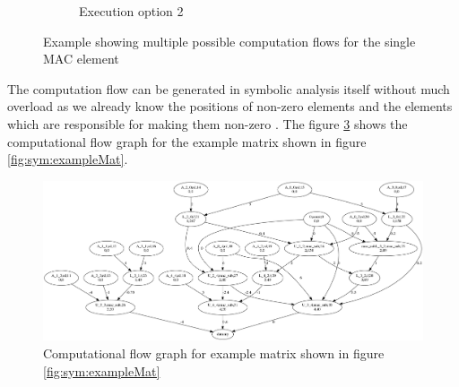 \begin{figure}
\begin{subfigure}[t]{0.32\textwidth}
        \caption{Execution option 2}
        \label{fig:sym:example:mac2}
    \end{subfigure}
    \caption{Example showing multiple possible computation flows for the single MAC element}
    \label{fig:sym:example:mac}
\end{figure}


The computation flow can be generated in symbolic analysis itself without much overload as we already know 
the positions of non-zero elements and the elements which are responsible for making them non-zero . 
The figure \ref{fig:sym:flowGraph} shows the 
computational flow graph for the example matrix shown in figure \ref{fig:sym:exampleMat}.

\begin{figure}
    \centering
    \includegraphics[width = \textwidth]{./Scheduler/exeTree.png}
    \caption{Computational flow graph for example matrix shown in figure \ref{fig:sym:exampleMat}}
    \label{fig:sym:flowGraph}
\end{figure}

